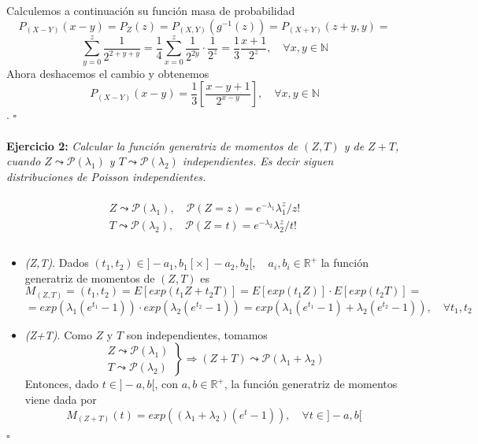 \documentclass[fleqn]{article}
\newcommand*{\QED}{\hfill\ensuremath{\square}}
\def\R{\mathds{R}}
\def\N{\mathds{N}}
\begin{document}
    Calculemos a continuación su función masa de probabilidad 
    $$P_{(X-Y)}(x-y) = P_Z(z) = P_{(X,Y)}(g^{-1}(z)) = P_{(X+Y)}(z+y,y) = $$
    $$\sum _{y=0}^z \frac{1}{2^{2+y+y}} = \frac{1}{4}\sum _{x=0}^z \frac{1}{2^{2y}}\cdot \frac{1}{2^{z}} = 
    \frac{1}{3}\frac{x+1}{2^{z}}, \quad \forall x,y \in \N$$
    Ahora deshacemos el cambio y obtenemos
    $$P_{(X-Y)}(x-y) = \frac{1}{3}\left[\frac{x-y+1}{2^{x-y}}\right], \quad \forall x,y \in \N$$. \QED \\ \\

    \textbf{Ejercicio 2: } \textit{Calcular la función generatriz de momentos de 
    $(Z,T)$ y de $Z+T$, cuando $Z\leadsto\mathcal{P}(\lambda_1)$ y $T\leadsto\mathcal{P}(\lambda_2)$
    independientes. Es decir siguen distribuciones de Poisson independientes.}\\ \\

    \begin{equation*}
        \begin{aligned}
            Z \leadsto \mathcal{P}(\lambda_1), \quad \mathcal{P}(Z=z) = e^{-\lambda_1} \lambda_1^z/z! \\
            T \leadsto \mathcal{P}(\lambda_2), \quad \mathcal{P}(Z=t) = e^{-\lambda_2} \lambda_2^z/t!\\ \\
        \end{aligned}
    \end{equation*}

    \begin{itemize}
        \item \textit{(Z,T)}. Dados $(t_1,t_2) \in ]-a_1,b_1[\times]-a_2,b_2[, \quad a_i,b_i \in \R^+$ 
                la función generatriz de momentos de $(Z,T)$ es 
                $$M_{(Z,T)} = (t_1,t_2) = E\left[exp(t_1Z + t_2T)\right] = E\left[exp(t_1Z)\right]\cdot E\left[exp(t_2T)\right] = $$
                $$ = exp\left(\lambda_1(e^{t_1}-1)\right)\cdot exp\left(\lambda_2(e^{t_2}-1)\right) = exp\left(\lambda_1(e^{t_1}-1) + \lambda_2(e^{t_2}-1)\right), \quad \forall t_1,t_2$$
        \item \textit{(Z+T)}. Como $Z$ y $T$ son independientes, tomamos
                \begin{equation*} 
                    \left.
                    \begin{aligned}
                        Z \leadsto \mathcal{P}(\lambda_1)\\
                        T \leadsto \mathcal{P}(\lambda_2)
                    \end{aligned}
                    \right\} \Rightarrow (Z+T) \leadsto  \mathcal{P}(\lambda_1 + \lambda_2)
                \end{equation*}
                Entonces, dado $t \in ]-a,b[$, con $a,b \in \R^+$, la función generatriz de momentos viene dada por 
                $$M_{(Z+T)}(t) = exp\left((\lambda_1 + \lambda_2)(e^{t}-1)\right), \quad \forall t \in ]-a,b[$$
                
    \end{itemize} \QED



    
\end{document}
